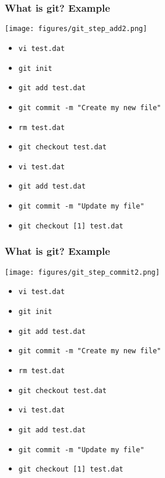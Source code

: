 \documentclass[xcolor=dvipsnames,10pt]{beamer}
\begin{document}
\addtocounter{framenumber}{-1}
\begin{frame}
 \frametitle{What is git? Example}
 
 \begin{center}
  \texttt{[image: figures/git\_step\_add2.png]}
 \end{center}
 \vspace*{-0.5cm}
 
 \begin{itemize}
  \color{gray}
  \item[] \texttt{vi test.dat}
  \item[] \texttt{git init}
  \item[] \texttt{git add test.dat}
  \item[] \texttt{git commit -m "Create my new file"}
  \item[] \texttt{rm test.dat}
  \item[] \texttt{git checkout test.dat}
  \item[] \texttt{vi test.dat}
  \color{black}
  \item   \texttt{git add test.dat}
  \color{white}
  \item[] \texttt{git commit -m "Update my file"}
  \item[] \texttt{git checkout [1] test.dat}
 \end{itemize}

\end{frame}
\addtocounter{framenumber}{-1}
\begin{frame}
 \frametitle{What is git? Example}
 
 \begin{center}
  \texttt{[image: figures/git\_step\_commit2.png]}
 \end{center}
 \vspace*{-0.5cm}
 
 \begin{itemize}
  \color{gray}
  \item[] \texttt{vi test.dat}
  \item[] \texttt{git init}
  \item[] \texttt{git add test.dat}
  \item[] \texttt{git commit -m "Create my new file"}
  \item[] \texttt{rm test.dat}
  \item[] \texttt{git checkout test.dat}
  \item[] \texttt{vi test.dat}
  \item[] \texttt{git add test.dat}
  \color{black}
  \item   \texttt{git commit -m "Update my file"}
  \color{white}
  \item[] \texttt{git checkout [1] test.dat}
 \end{itemize}

\end{frame}
\end{document}
